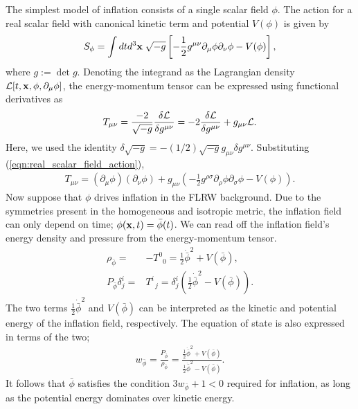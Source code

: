 The simplest model of inflation consists of a single scalar field $\phi$. The action for a real scalar field with canonical kinetic term and potential $V(\phi)$ is given by
\begin{align}
	S_\phi = \int dt d^3 \mathbf{x} \; \sqrt{-g} \left[ -\frac{1}{2} g^{\mu\nu} \partial_\mu \phi \partial_\nu \phi - V(\phi) \right],		\label{eqn:real_scalar_field_action}
\end{align}
where $g:=\det g$. Denoting the integrand as the Lagrangian density $\mathcal{L}[t, \mathbf{x}, \phi, \partial_\mu \phi]$, the energy-momentum tensor can be expressed using functional derivatives as
\begin{align}
	T_{\mu\nu} = \frac{-2}{\sqrt{-g}} \frac{\delta\mathcal{L}}{\delta g^{\mu\nu}} = -2 \frac{\delta \mathcal{L}}{\delta g^{\mu\nu}} + g_{\mu\nu} \mathcal{L}.
\end{align}
Here, we used the identity $\delta\sqrt{-g} = -(1/2) \sqrt{-g} g_{\mu\nu} \delta g^{\mu\nu}$. Substituting (\ref{eqn:real_scalar_field_action}),
\begin{align}
	T_{\mu\nu} = \left( \partial_\mu \phi \right) \left( \partial_\nu \phi \right) + g_{\mu\nu} \left( -\frac{1}{2} g^{\rho\sigma} \partial_\rho \phi \partial_\sigma \phi - V(\phi) \right).
\end{align}
Now suppose that $\phi$ drives inflation in the FLRW background. Due to the symmetries present in the homogeneous and isotropic metric, the inflation field can only depend on time; $\phi(\mathbf{x}, t) = \bar{\phi}(t)$. We can read off the inflation field's energy density and pressure from the energy-momentum tensor.
\begin{align}
	\rho_{\bar{\phi}} =& -T^0_{\;\;0} = \frac{1}{2} \dot{\bar{\phi}}^2 + V(\bar{\phi}),	\\
	P_{\bar{\phi}} \delta^i_j =& T^i_{\;\;j} = \delta^i_j \left( \frac{1}{2} \dot{\bar{\phi}}^2 - V(\bar{\phi}) \right).
\end{align}
The two terms $\frac{1}{2} \dot{\bar{\phi}}^2$ and $V(\bar{\phi})$ can be interpreted as the kinetic and potential energy of the inflation field, respectively. The equation of state is also expressed in terms of the two;
\begin{align}
	w_{\bar{\phi}} = \frac{P_{\bar{\phi}}}{\rho_{\bar{\phi}}} = \frac{\frac{1}{2} \dot{\bar{\phi}}^2 + V(\bar{\phi})}{\frac{1}{2} \dot{\bar{\phi}}^2 - V(\bar{\phi})}.
\end{align}
It follows that $\bar{\phi}$ satisfies the condition $3w_{\bar{\phi}}+1<0$ required for inflation, as long as the potential energy dominates over kinetic energy.

